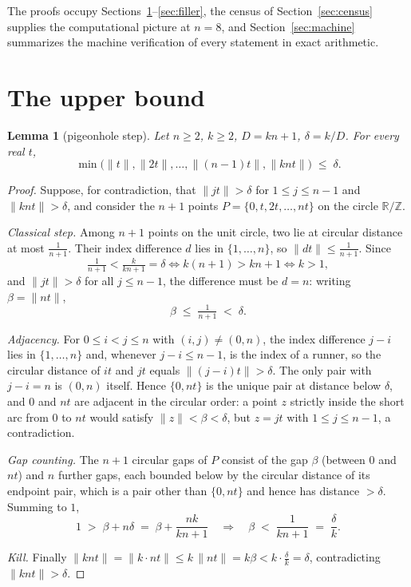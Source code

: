 \documentclass[11pt,a4paper]{article}
\theoremstyle{plain}
\newtheorem{lemma}[theorem]{Lemma}
\theoremstyle{definition}
\theoremstyle{remark}
\newcommand{\norm}[1]{\lVert #1 \rVert}
\newcommand{\R}{\mathbb{R}}
\newcommand{\Z}{\mathbb{Z}}
\begin{document}
The proofs occupy Sections~\ref{sec:value}--\ref{sec:filler}, the census of
Section~\ref{sec:census} supplies the computational picture at $n = 8$, and
Section~\ref{sec:machine} summarizes the machine verification of every
statement in exact arithmetic.

\section{The upper bound}\label{sec:value}

\begin{lemma}[pigeonhole step]\label{lem:pigeon}
Let $n \ge 2$, $k \ge 2$, $D = kn+1$, $\delta = k/D$. For every real $t$,
\[
  \min\bigl( \norm{t}, \norm{2t}, \dots, \norm{(n-1)t}, \norm{knt} \bigr)
  \;\le\; \delta .
\]
\end{lemma}

\begin{proof}
Suppose, for contradiction, that $\norm{jt} > \delta$ for $1 \le j \le n-1$
and $\norm{knt} > \delta$, and consider the $n+1$ points
$P = \{0, t, 2t, \dots, nt\}$ on the circle $\R/\Z$.

\emph{Classical step.} Among $n+1$ points on the unit circle, two lie at
circular distance at most $\tfrac1{n+1}$. Their index difference $d$ lies in
$\{1, \dots, n\}$, so $\norm{dt} \le \tfrac1{n+1}$. Since
\[
  \tfrac{1}{n+1} < \tfrac{k}{kn+1} = \delta
  \iff k(n+1) > kn + 1 \iff k > 1,
\]
and $\norm{jt} > \delta$ for all $j \le n-1$, the difference must be $d = n$:
writing $\beta = \norm{nt}$,
\[
  \beta \;\le\; \tfrac{1}{n+1} \;<\; \delta .
\]

\emph{Adjacency.} For $0 \le i < j \le n$ with $(i,j) \ne (0,n)$, the index
difference $j - i$ lies in $\{1, \dots, n\}$ and, whenever $j - i \le n-1$,
is the index of a runner, so the circular distance of $it$ and $jt$ equals
$\norm{(j-i)t} > \delta$. The only pair with $j - i = n$ is $(0,n)$ itself.
Hence $\{0, nt\}$ is the unique pair at distance below $\delta$, and $0$ and
$nt$ are adjacent in the circular order: a point $z$ strictly inside the
short arc from $0$ to $nt$ would satisfy $\norm{z} < \beta < \delta$, but
$z = jt$ with $1 \le j \le n-1$, a contradiction.

\emph{Gap counting.} The $n+1$ circular gaps of $P$ consist of the gap
$\beta$ (between $0$ and $nt$) and $n$ further gaps, each bounded below by
the circular distance of its endpoint pair, which is a pair other than
$\{0, nt\}$ and hence has distance $> \delta$. Summing to $1$,
\[
  1 \;>\; \beta + n\delta \;=\; \beta + \frac{nk}{kn+1}
  \quad\Longrightarrow\quad
  \beta \;<\; \frac{1}{kn+1} \;=\; \frac{\delta}{k}.
\]

\emph{Kill.} Finally $\norm{knt} = \norm{k \cdot nt} \le k\,\norm{nt} =
k\beta < k \cdot \tfrac{\delta}{k} = \delta$, contradicting
$\norm{knt} > \delta$.
\end{proof}
\end{document}
